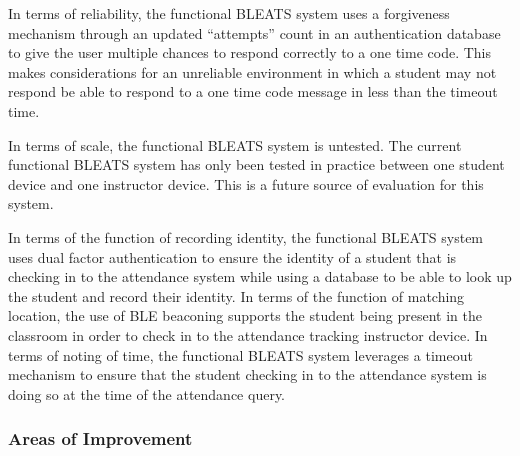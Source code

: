 In terms of reliability, the functional BLEATS system uses a forgiveness
mechanism through an updated “attempts” count in an authentication database to
give the user multiple chances to respond correctly to a one time code. This
makes considerations for an unreliable environment in which a student may not
respond be able to respond to a one time code message in less than the timeout
time. 

In terms of scale, the functional BLEATS system is untested. The current
functional BLEATS system has only been tested in practice between one student
device and one instructor device. This is a future source of evaluation for
this system.

In terms of the function of recording identity, the functional BLEATS system
uses dual factor authentication to ensure the identity of a student that is
checking in to the attendance system while using a database to be able to look
up the student and record their identity. In terms of the function of matching
location, the use of BLE beaconing supports the student being present in the
classroom in order to check in to the attendance tracking instructor device. In
terms of noting of time, the functional BLEATS system leverages a timeout
mechanism to ensure that the student checking in to the attendance system is
doing so at the time of the attendance query.

\subsubsection{Areas of Improvement}

